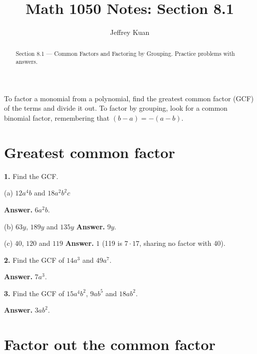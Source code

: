 \documentclass{ximera}
\author{Jeffrey Kuan}
\title{Math 1050 Notes: Section 8.1}
\begin{document}
\begin{abstract}
    Section 8.1 --- Common Factors and Factoring by Grouping.
    Practice problems with answers.
\end{abstract}

\maketitle

To factor a monomial from a polynomial, find the greatest common factor (GCF) of the
terms and divide it out. To factor by grouping, look for a common binomial factor,
remembering that $(b-a) = -(a-b)$.

\section*{Greatest common factor}

\begin{problem}

\textbf{1.} Find the GCF.

(a) $12a^{4}b$ and $18a^{2}b^{2}c$ \qquad

\begin{hint}
\textbf{Answer.} $6a^{2}b$.

(b) $63y$, $189y$ and $135y$ \qquad \textbf{Answer.} $9y$.

(c) $40$, $120$ and $119$ \qquad \textbf{Answer.} $1$ (119 is $7 \cdot 17$, sharing no
factor with 40).
\end{hint}
\end{problem}

\begin{problem}

\textbf{2.} Find the GCF of $14a^{3}$ and $49a^{7}$. \qquad

\begin{hint}
\textbf{Answer.} $7a^{3}$.
\end{hint}
\end{problem}

\begin{problem}

\textbf{3.} Find the GCF of $15a^{4}b^{2}$, $9ab^{5}$ and $18ab^{2}$. \qquad

\begin{hint}
\textbf{Answer.} $3ab^{2}$.
\end{hint}
\end{problem}

\section*{Factor out the common factor}
\end{document}
